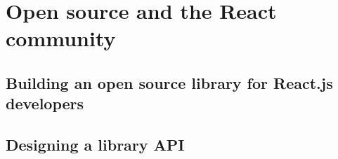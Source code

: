 \chapter{Open source and the React community}

\section{Building an open source library for React.js developers}

\section{Designing a library API}